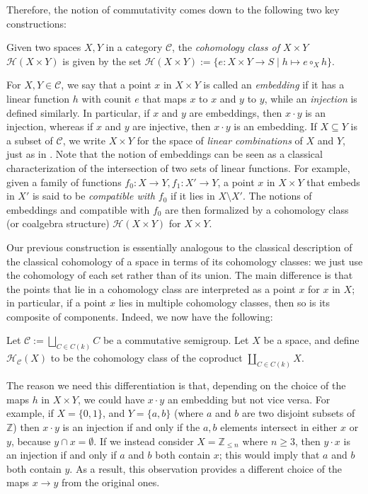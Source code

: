 \documentclass[a4paper,reqno,oneside]{article}
\begin{document}
Therefore, the notion of commutativity comes down to the following two key constructions:

\begin{construction}
	Given two spaces $X, Y$ in a category $\mathcal C$, the \textit{cohomology class of $X \times Y$} $\mathcal H(X \times Y)$ is given by the set $\mathcal H(X \times Y) := \{e : X \times Y \to S \mid h \mapsto e \circ_X h\}$.
\end{construction}

For $X, Y \in \mathcal C$, we say that a point $x$ in $X \times Y$ is called an \textit{embedding} if it has a linear function $h$ with counit $e$ that maps $x$ to $x$ and $y$ to $y$, while an \textit{injection} is defined similarly. In particular, if $x$ and $y$ are embeddings, then $x \cdot y$ is an injection, whereas if $x$ and $y$ are injective, then $x \cdot y$ is an embedding. If $X \subseteq Y$ is a subset of $\mathcal C$, we write $X \times Y$ for the space of \textit{linear combinations} of $X$ and $Y$, just as in \cite{Leary}. Note that the notion of embeddings can be seen as a classical characterization of the intersection of two sets of linear functions. For example, given a family of functions $f_{0} : X \to Y, f_{1} : X' \to Y$, a point $x$ in $X \times Y$ that embeds in $X'$ is said to be \textit{compatible with $f_{0}$} if it lies in $X \setminus X'$. The notions of embeddings and compatible with $f_{0}$ are then formalized by a cohomology class (or coalgebra structure) $\mathcal H(X \times Y)$ for $X \times Y$.

Our previous construction is essentially analogous to the classical description of the classical cohomology of a space in terms of its cohomology classes: we just use the cohomology of each set rather than of its union. The main difference is that the points that lie in a cohomology class are interpreted as a point $x$ for $x$ in $X$; in particular, if a point $x$ lies in multiple cohomology classes, then so is its composite of components. Indeed, we now have the following:
\begin{corollary}
	Let $\mathcal C := \bigsqcup_{C \in C(k)} C$ be a commutative semigroup. Let $X$ be a space, and define $\mathcal H_{\mathcal C}(X)$ to be the cohomology class of the coproduct $\coprod_{C \in C(k)} X$.
\end{corollary}

The reason we need this differentiation is that, depending on the choice of the maps $h$ in $X \times Y$, we could have $x \cdot y$ an embedding but not vice versa. For example, if $X = \{0, 1\}$, and $Y = \{a, b\}$ (where $a$ and $b$ are two disjoint subsets of $\mathbb Z$) then $x \cdot y$ is an injection if and only if the $a, b$ elements intersect in either $x$ or $y$, because $y \cap x = \emptyset$. If we instead consider $X = \mathbb{Z}_{\le n}$ where $n \ge 3$, then $y \cdot x$ is an injection if and only if $a$ and $b$ both contain $x$; this would imply that $a$ and $b$ both contain $y$. As a result, this observation provides a different choice of the maps $x \to y$ from the original ones.
\end{document}
